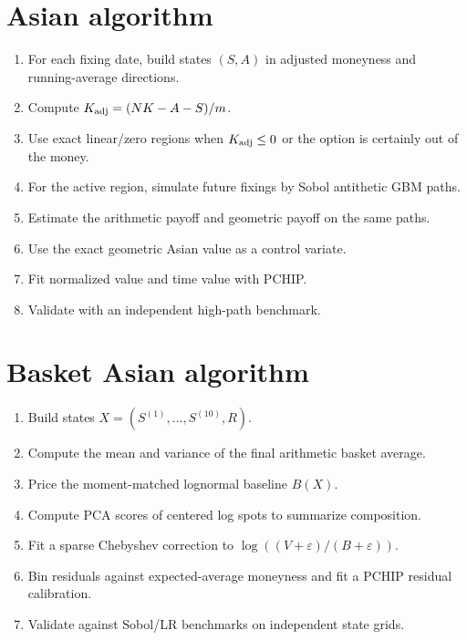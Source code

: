 \documentclass[11pt,oneside]{book}
\theoremstyle{definition}
\begin{document}
\section{Asian algorithm}
\begin{enumerate}
  \item For each fixing date, build states \((S,A)\) in adjusted moneyness and running-average directions.
  \item Compute \(K_{\rm adj}=(NK-A-S)/m\).
  \item Use exact linear/zero regions when \(K_{\rm adj}\le0\) or the option is certainly out of the money.
  \item For the active region, simulate future fixings by Sobol antithetic GBM paths.
  \item Estimate the arithmetic payoff and geometric payoff on the same paths.
  \item Use the exact geometric Asian value as a control variate.
  \item Fit normalized value and time value with PCHIP.
  \item Validate with an independent high-path benchmark.
\end{enumerate}

\section{Basket Asian algorithm}
\begin{enumerate}
  \item Build states \(X=(S^{(1)},\ldots,S^{(10)},R)\).
  \item Compute the mean and variance of the final arithmetic basket average.
  \item Price the moment-matched lognormal baseline \(B(X)\).
  \item Compute PCA scores of centered log spots to summarize composition.
  \item Fit a sparse Chebyshev correction to \(\log((V+\varepsilon)/(B+\varepsilon))\).
  \item Bin residuals against expected-average moneyness and fit a PCHIP residual calibration.
  \item Validate against Sobol/LR benchmarks on independent state grids.
\end{enumerate}
\end{document}
